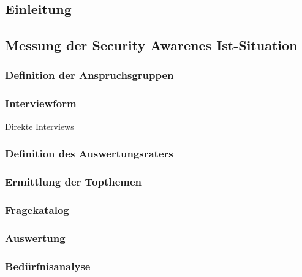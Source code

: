 \documentclass[../../main.tex]{subfiles}
\begin{document}
\subsection{Einleitung}


\subsection{Messung der Security Awarenes Ist-Situation}

\subsubsection{Definition der Anspruchsgruppen}


\subsubsection{Interviewform}
  Direkte Interviews

\subsubsection{Definition des Auswertungsraters}
\subsubsection{Ermittlung der Topthemen}
  
\subsubsection{Fragekatalog}

\subsubsection{Auswertung}

\subsubsection{Bedürfnisanalyse}
\end{document}
